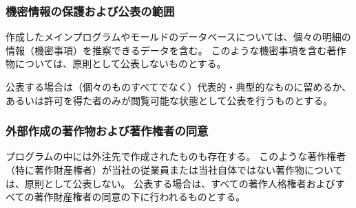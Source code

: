 \subsubsection{機密情報の保護および公表の範囲\label{subsec:notopenwork}}
作成したメインプログラムやモールドのデータベースについては、個々の明細の情報（機密事項）を推察できるデータを含む。
このような機密事項を含む著作物については、原則として公表しないものとする。

公表する場合は（個々のものすべてでなく）代表的・典型的なものに留めるか、あるいは許可を得た者のみが閲覧可能な状態として公表を行うものとする。

\subsubsection{外部作成の著作物および著作権者の同意\label{subsec:standardscopyrightsSubcontractor}}
プログラムの中には外注先で作成されたものも存在する。
このような著作権者（特に著作財産権者）が当社の従業員または当社自体ではない著作物については、原則として公表しない。
公表する場合は、すべての著作人格権者およびすべての著作財産権者の同意の下に行われるものとする。



